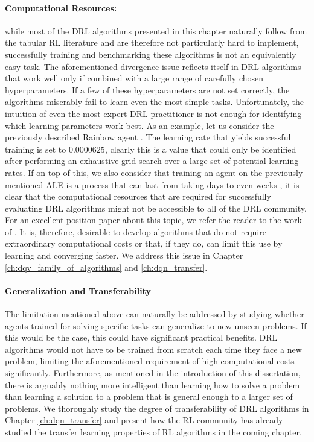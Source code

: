 \paragraph{Computational Resources:} while most of the DRL algorithms presented in this chapter naturally follow from the tabular RL literature and are therefore not particularly hard to implement, successfully training and benchmarking these algorithms is not an equivalently easy task. 
The aforementioned divergence issue reflects itself in DRL algorithms that work well only if combined with a large range of carefully chosen hyperparameters. If a few of these hyperparameters are not set correctly, the algorithms miserably fail to learn even the most simple tasks. Unfortunately, the intuition of even the most expert DRL practitioner is not enough for identifying which learning parameters work best. As an example, let us consider the previously described Rainbow agent \cite{hessel2018rainbow}. The learning rate that yields successful training is set to $0.0000625$, clearly this is a value that could only be identified after performing an exhaustive grid search over a large set of potential learning rates. If on top of this, we also consider that training an agent on the previously mentioned ALE is a process that can last from taking days to even weeks \cite{kaiser2019model}, it is clear that the computational resources that are required for successfully evaluating DRL algorithms might not be accessible to all of the DRL community. For an excellent position paper about this topic, we refer the reader to the work of \citet{obando2020revisiting}. It is, therefore, desirable to develop algorithms that do not require extraordinary computational costs or that, if they do, can limit this use by learning and converging faster. We address this issue in Chapter \ref{ch:dqv_family_of_algorithms} and \ref{ch:dqn_transfer}.


\paragraph{Generalization and Transferability}
The limitation mentioned above can naturally be addressed by studying whether agents trained for solving specific tasks can generalize to new unseen problems. If this would be the case, this could have significant practical benefits. DRL algorithms would not have to be trained from scratch each time they face a new problem, limiting the aforementioned requirement of high computational costs significantly. Furthermore, as mentioned in the introduction of this dissertation, there is arguably nothing more intelligent than learning how to solve a problem than learning a solution to a problem that is general enough to a larger set of problems. We thoroughly study the degree of transferability of DRL algorithms in Chapter \ref{ch:dqn_transfer} and present how the RL community has already studied the transfer learning properties of RL algorithms in the coming chapter.




